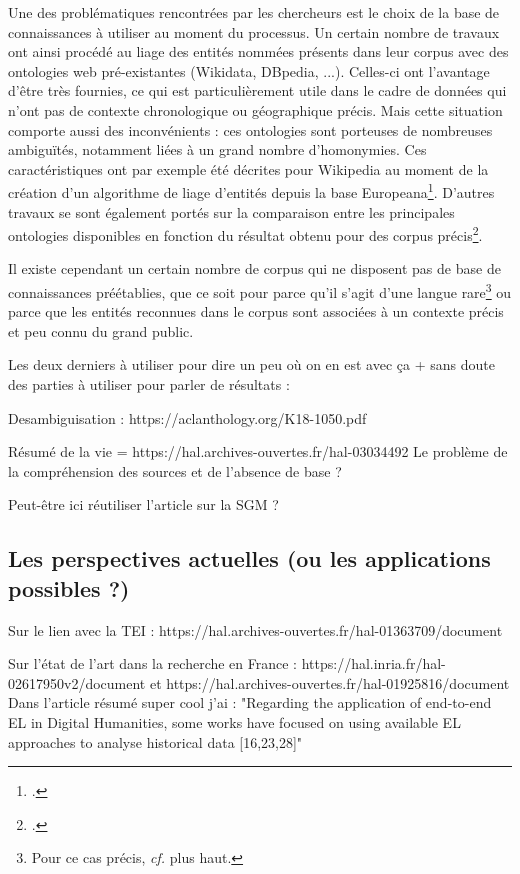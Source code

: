 \documentclass[a4paper,12pt,twoside]{book}
\begin{document}
	Une des problématiques rencontrées par les chercheurs est le choix de la base de connaissances à utiliser au moment du processus. Un certain nombre de travaux ont ainsi procédé au liage des entités nommées présents dans leur corpus avec des ontologies web pré-existantes (Wikidata, DBpedia, ...). Celles-ci ont l'avantage d'être très fournies, ce qui est particulièrement utile dans le cadre de données qui n'ont pas de contexte chronologique ou géographique précis. Mais cette situation comporte aussi des inconvénients : ces ontologies sont porteuses de nombreuses ambiguïtés, notamment liées à un grand nombre d'homonymies. Ces caractéristiques ont par exemple été décrites pour Wikipedia au moment de la création d'un algorithme de liage d'entités depuis la base Europeana\footcite{agirre_matching_2012}. D'autres travaux se sont également portés sur la comparaison entre les principales ontologies disponibles en fonction du résultat obtenu pour des corpus précis\footcite{soudani_adaptation_2018}.
	
	Il existe cependant un certain nombre de corpus qui ne disposent pas de base de connaissances préétablies, que ce soit pour parce qu'il s'agit d'une langue rare\footnote{Pour ce cas précis, \textit{cf.} plus haut.} ou parce que les entités reconnues dans le corpus sont associées à un contexte précis et peu connu du grand public.
	
	

	Les deux derniers à utiliser pour dire un peu où on en est avec ça + sans doute des parties à utiliser pour parler de résultats :
	
	Desambiguisation : https://aclanthology.org/K18-1050.pdf
	
	Résumé de la vie =	https://hal.archives-ouvertes.fr/hal-03034492
	Le problème de la compréhension des sources et de l'absence de base ?
	
	Peut-être ici réutiliser l'article sur la SGM ?

	\subsection{Les perspectives actuelles (ou les applications possibles ?)}
	
	Sur le lien avec la TEI : https://hal.archives-ouvertes.fr/hal-01363709/document
	
	Sur l'état de l'art dans la recherche en France : https://hal.inria.fr/hal-02617950v2/document et https://hal.archives-ouvertes.fr/hal-01925816/document
	Dans l'article résumé super cool j'ai : "Regarding the application of end-to-end EL in Digital Humanities, some
	works have focused on using available EL approaches to analyse historical data
	[16,23,28]"
	
\end{document}

